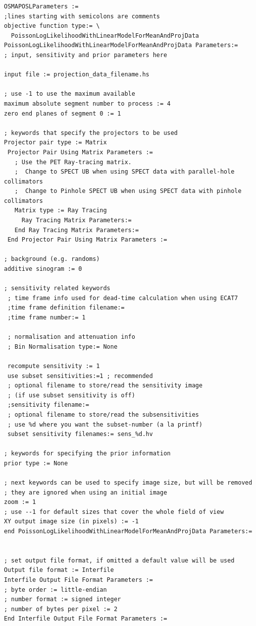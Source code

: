 \documentclass{article}
\begin{document}
{\small 
\begin{verbatim}
OSMAPOSLParameters :=
;lines starting with semicolons are comments
objective function type:= \
  PoissonLogLikelihoodWithLinearModelForMeanAndProjData
PoissonLogLikelihoodWithLinearModelForMeanAndProjData Parameters:=
; input, sensitivity and prior parameters here

input file := projection_data_filename.hs

; use -1 to use the maximum available
maximum absolute segment number to process := 4
zero end planes of segment 0 := 1

; keywords that specify the projectors to be used
Projector pair type := Matrix 
 Projector Pair Using Matrix Parameters := 
   ; Use the PET Ray-tracing matrix.
   ;  Change to SPECT UB when using SPECT data with parallel-hole collimators
   ;  Change to Pinhole SPECT UB when using SPECT data with pinhole collimators
   Matrix type := Ray Tracing
     Ray Tracing Matrix Parameters:=
   End Ray Tracing Matrix Parameters:= 
 End Projector Pair Using Matrix Parameters :=

; background (e.g. randoms)
additive sinogram := 0

; sensitivity related keywords
 ; time frame info used for dead-time calculation when using ECAT7
 ;time frame definition filename:=
 ;time frame number:= 1

 ; normalisation and attenuation info
 ; Bin Normalisation type:= None
 
 recompute sensitivity := 1
 use subset sensitivities:=1 ; recommended 
 ; optional filename to store/read the sensitivity image 
 ; (if use subset sensitivity is off)
 ;sensitivity filename:=
 ; optional filename to store/read the subsensitivities
 ; use %d where you want the subset-number (a la printf)
 subset sensitivity filenames:= sens_%d.hv

; keywords for specifying the prior information
prior type := None

; next keywords can be used to specify image size, but will be removed
; they are ignored when using an initial image
zoom := 1
; use --1 for default sizes that cover the whole field of view
XY output image size (in pixels) := -1
end PoissonLogLikelihoodWithLinearModelForMeanAndProjData Parameters:=


; set output file format, if omitted a default value will be used
Output file format := Interfile 
Interfile Output File Format Parameters := 
; byte order := little-endian 
; number format := signed integer 
; number of bytes per pixel := 2 
End Interfile Output File Format Parameters :=


\end{verbatim}}
\end{document}
